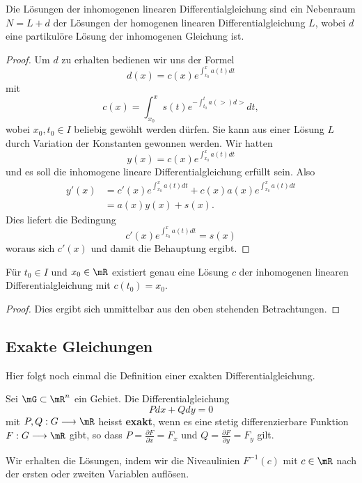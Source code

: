 \documentclass[%
11pt,%
twoside,%
titlepage,%
german,%
headsepline%
]{scrartcl}
\begin{document}
\begin{satz}
Die L\"osungen der inhomogenen linearen Differentialgleichung sind ein Nebenraum $N=L+d$ der L\"osungen der homogenen linearen Differentialgleichung $L$, wobei $d$ eine partikul\"ore L\"osung der inhomogenen Gleichung ist.
\end{satz}

\begin{proof}
Um $d$ zu erhalten bedienen wir uns der Formel
$$d(x)=c(x)e^{\int_{x_0}^xa(t)dt}$$
mit
$$c(x)=\int_{x_0}^xs(t)e^{-\int_{t_0}^ta(\gt)d\gt}dt,$$
wobei $x_0,t_0\in I$ beliebig gew\"ohlt werden d\"urfen.
Sie kann aus einer L\"osung $L$ durch Variation der Konstanten gewonnen werden. Wir hatten
$$y(x)=c(x)e^{\int_{x_0}^xa(t)dt}$$
und es soll die inhomogene lineare Differentialgleichung erf\"ullt sein. Also
\begin{align*}
y'(x) &=c'(x)e^{\int_{x_0}^xa(t)dt}+c(x)a(x)e^{\int_{x_0}^xa(t)dt}\\
&=a(x)y(x)+s(x).
\end{align*}
Dies liefert die Bedingung
$$c'(x)e^{\int_{x_0}^xa(t)dt}=s(x)$$
woraus sich $c'(x)$ und damit die Behauptung ergibt.
\end{proof}

\begin{kor}
F\"ur $t_0\in I$ und $x_0\in\mR$ existiert genau eine L\"osung $c$ der inhomogenen linearen Differentialgleichung mit $c(t_0)=x_0$.
\end{kor}

\begin{proof}
Dies ergibt sich unmittelbar aus den oben stehenden Betrachtungen.
\end{proof}

\subsection{Exakte Gleichungen}

Hier folgt noch einmal die Definition einer exakten Differentialgleichung.
\begin{defn}
Sei
$\mG\subset\mR^n$ ein Gebiet. Die Differentialgleichung
$$Pdx+Qdy=0$$
mit $P,Q:G\longrightarrow\mR$ heisst \textbf{exakt}, wenn es eine stetig differenzierbare Funktion $F:G\longrightarrow\mR$ gibt, so dass $P=\frac{\partial F}{\partial x}=F_x$ und $Q=\frac{\partial F}{\partial y}=F_y$ gilt.
\end{defn}
\noindent Wir erhalten die L\"osungen, indem wir die Niveaulinien $F^{-1}(c)$ mit $c\in\mR$ nach der ersten oder zweiten Variablen aufl\"osen.
\end{document}
